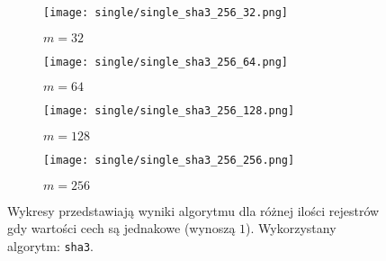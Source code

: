 \begin{figure}[H]
    \begin{subfigure}{0.5\textwidth}
        \texttt{[image: single/single\_sha3\_256\_32.png]}
        \caption{$m = 32$}
        \label{fig:subim1}
    \end{subfigure}
    \begin{subfigure}{0.5\textwidth}
        \texttt{[image: single/single\_sha3\_256\_64.png]}
        \caption{$m = 64$}
        \label{fig:subim1}
    \end{subfigure}
    \begin{subfigure}{0.5\textwidth}
        \texttt{[image: single/single\_sha3\_256\_128.png]}
        \caption{$m = 128$}
        \label{fig:subim2}
    \end{subfigure}
    \begin{subfigure}{0.5\textwidth}
        \texttt{[image: single/single\_sha3\_256\_256.png]}
        \caption{$m = 256$}
        \label{fig:subim2}
    \end{subfigure}

    \caption{Wykresy przedstawiają wyniki algorytmu dla różnej ilości rejestrów gdy wartości cech są jednakowe (wynoszą $1$). Wykorzystany algorytm: \texttt{sha3}.}
    \label{fig:uniform_sha3_256}
\end{figure}
